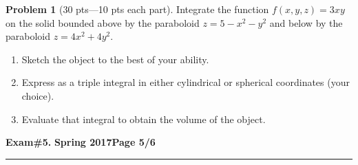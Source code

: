 \documentclass[12pt]{article}
\theoremstyle{definition}
\newtheorem{problem}{Problem}
\begin{document}
\bigskip
\begin{problem}[30 pts---10 pts each part]
Integrate the function $f(x,y,z)=3xy$ on the solid bounded above by the paraboloid $z=5-x^2-y^2$ and below by the paraboloid $z=4x^2+4y^2$.
\begin{enumerate}
\item Sketch the object to the best of your ability.
\vspace{5cm}
\item Express as a triple integral in either cylindrical or spherical coordinates (your choice).
\vspace{5cm}
\begin{flushright}
\end{flushright}
\item Evaluate that integral to obtain the volume of the object.
\vspace{5cm}
\begin{flushright}
\end{flushright}
\end{enumerate}
\end{problem}



\newpage

\hfill{\large\bf Exam\#5.}\hfill{\large\bf
  Spring 2017}\hfill{\large\bf Page 5/6}\hrule
\end{document}
